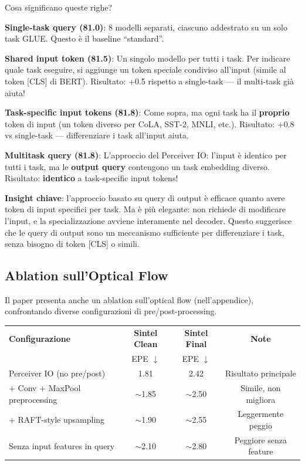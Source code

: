 \documentclass[12pt,a4paper]{article}
\begin{document}
\begin{notabox}
Cosa significano queste righe?

\textbf{Single-task query (81.0)}: 8 modelli separati, ciascuno addestrato su un solo task GLUE. Questo \`e il baseline ``standard''.

\textbf{Shared input token (81.5)}: Un singolo modello per tutti i task. Per indicare quale task eseguire, si aggiunge un token speciale condiviso all'input (simile al token [CLS] di BERT). Risultato: +0.5 rispetto a single-task --- il multi-task gi\`a aiuta!

\textbf{Task-specific input tokens (81.8)}: Come sopra, ma ogni task ha il \textbf{proprio} token di input (un token diverso per CoLA, SST-2, MNLI, etc.). Risultato: +0.8 vs single-task --- differenziare i task all'input aiuta.

\textbf{Multitask query (81.8)}: L'approccio del Perceiver IO: l'input \`e identico per tutti i task, ma le \textbf{output query} contengono un task embedding diverso. Risultato: \textbf{identico} a task-specific input tokens!

\textbf{Insight chiave}: l'approccio basato su query di output \`e efficace quanto avere token di input specifici per task. Ma \`e pi\`u elegante: non richiede di modificare l'input, e la specializzazione avviene interamente nel decoder. Questo suggerisce che le query di output sono un meccanismo sufficiente per differenziare i task, senza bisogno di token [CLS] o simili.
\end{notabox}

\subsection{Ablation sull'Optical Flow}

Il paper presenta anche un ablation sull'optical flow (nell'appendice), confrontando diverse configurazioni di pre/post-processing.

\begin{center}
\begin{tabular}{p{5cm}ccc}
\toprule
\textbf{Configurazione} & \textbf{Sintel Clean} & \textbf{Sintel Final} & \textbf{Note} \\
 & EPE $\downarrow$ & EPE $\downarrow$ & \\
\midrule
Perceiver IO (no pre/post) & 1.81 & 2.42 & Risultato principale \\
+ Conv + MaxPool preprocessing & $\sim$1.85 & $\sim$2.50 & Simile, non migliora \\
+ RAFT-style upsampling & $\sim$1.90 & $\sim$2.55 & Leggermente peggio \\
Senza input features in query & $\sim$2.10 & $\sim$2.80 & Peggiore senza feature \\
\bottomrule
\end{tabular}
\end{center}
\end{document}
